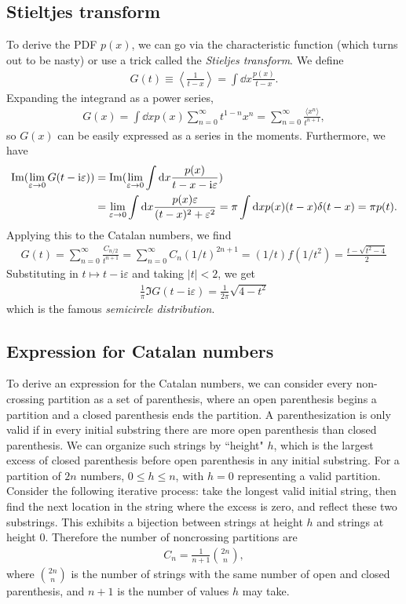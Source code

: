 \documentclass[11pt]{article}
\newcommand{\ii}{\mathrm i}
\renewcommand{\epsilon}{\varepsilon}
\theoremstyle{definition}
\begin{document}
\subsection{Stieltjes transform}
To derive the PDF $p(x)$, we can go via the characteristic function (which turns out to be nasty) or use a trick called the \emph{Stieljes transform}. We define
\begin{align}\label{eq:stieltjes}
G(t) \equiv \left \langle \frac{1}{t-x}\right \rangle = \int \dd x\frac{p(x)}{t-x}.
\end{align}
Expanding the integrand as a power series,
\begin{align}
G(x) = \int \dd x p(x) \sum_{n = 0}^\infty t^{1-n}x^n = \sum_{n = 0}^\infty \frac{\langle x^n \rangle}{t^{n+1}},
\end{align}
so $G(x)$ can be easily expressed as a series in the moments. Furthermore, we have
\begin{align}
\Im(\lim_{\epsilon \to 0}G(t - \ii \epsilon)) &= \Im(\lim_{\epsilon \to 0}\int \dd x \frac{p(x)}{t-x-\ii \epsilon}) \notag\\
&= \lim_{\epsilon \to 0}\int \dd x \frac{p(x)\epsilon}{(t-x)^2+\epsilon^2}  = \pi\int \dd x p(x)(t-x)\delta(t-x) = \pi p(t).
\end{align}
Applying this to the Catalan numbers, we find
\begin{align}
G(t) = \sum_{n = 0}^\infty \frac{C_{n/2}}{t^{n+1}} = \sum_{n= 0}^\infty C_{n}(1/t)^{2n+1} = (1/t)f(1/t^2) = \frac{t-\sqrt{t^2-4}}{2}
\end{align}
Substituting in $t \mapsto t - \ii \epsilon$ and taking $|t| < 2$, we get
\begin{align}\label{eq:Cauchy}
\frac{1}{\pi}\Im G(t - \ii \epsilon) = \frac{1}{2\pi}\sqrt{4 - t^2}
\end{align}
which is the famous \emph{semicircle distribution}.

\subsection{Expression for Catalan numbers}
To derive an expression for the Catalan numbers, we can consider every non-crossing partition as a set of parenthesis, where an open parenthesis begins a partition and a closed parenthesis ends the partition. A parenthesization is only valid if in every initial substring there are more open parenthesis than closed parenthesis. We can organize such strings by ``height" $h$, which is the largest excess of closed parenthesis before open parenthesis in any initial substring. For a partition of $2n$ numbers, $0 \leq h \leq n$, with $h = 0$ representing a valid partition. Consider the following iterative process: take the longest valid initial string, then find the next location in the string where the excess is zero, and reflect these two substrings. This exhibits a bijection between strings at height $h$ and strings at height $0$. Therefore the number of noncrossing partitions are
\begin{align}
C_n = \frac{1}{n+1}\binom{2n}{n},
\end{align}
where $\binom{2n}{n}$ is the number of strings with the same number of open and closed parenthesis, and $n+1$ is the number of values $h$ may take.
\end{document}
